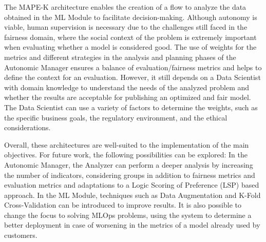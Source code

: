 \documentclass[sigconf]{acmart}
\begin{document}
The MAPE-K architecture enables the creation of a flow to analyze the data obtained in the ML Module to facilitate decision-making. Although autonomy is viable, human supervision is necessary due to the challenges still faced in the fairness domain, where the social context of the problem is extremely important when evaluating whether a model is considered good. The use of weights for the metrics and different strategies in the analysis and planning phases of the Autonomic Manager ensures a balance of evaluation/fairness metrics and helps to define the context for an evaluation. However, it still depends on a Data Scientist with domain knowledge to understand the needs of the analyzed problem and whether the results are acceptable for publishing an optimized and fair model. The Data Scientist can use a variety of factors to determine the weights, such as the specific business goals, the regulatory environment, and the ethical considerations.

Overall, these architectures are well-suited to the implementation of the main objectives. For future work, the following possibilities can be explored: In the Autonomic Manager, the Analyzer can perform a deeper analysis by increasing the number of indicators, considering groups in addition to fairness metrics and evaluation metrics and adaptations to a Logic Scoring of Preference (LSP) based approach. In the ML Module, techniques such as Data Augmentation and K-Fold Cross-Validation can be introduced to improve results. It is also possible to change the focus to solving MLOps problems, using the system to determine a better deployment in case of worsening in the metrics of a model already used by customers.



\end{document}
